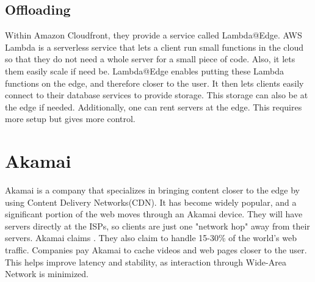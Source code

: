 \subsection{Offloading}
Within Amazon Cloudfront, they provide a service called Lambda@Edge. AWS Lambda is a serverless service that lets a client run small functions in the cloud so that they do not need a whole server for a small piece of code. Also, it lets them easily scale if need be. Lambda@Edge enables putting these Lambda functions on the edge, and therefore closer to the user. It then lets clients easily connect to their database services to provide storage. This storage can also be at the edge if needed. Additionally, one can rent servers at the edge. This requires more setup but gives more control.




\section{Akamai}
Akamai is a company that specializes in bringing content closer to the edge by using Content Delivery Networks(CDN). It has become widely popular, and a significant portion of the web moves through an Akamai device. They will have servers directly at the ISPs, so clients are just one "network hop" away from their servers. Akamai\cite{noauthor_exceptional_nodate} claims . They also claim to handle 15-30\% of the world's web traffic. Companies pay Akamai to cache videos and web pages closer to the user. This helps improve latency and stability, as interaction through Wide-Area Network is minimized. 

